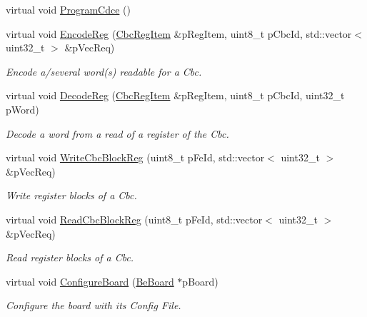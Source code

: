 \begin{DoxyCompactItemize}
\item 
virtual void \hyperlink{class_ph2___hw_interface_1_1_be_board_f_w_interface_a9575de192b6dd5613857ce255ec6947b}{Program\-Cdce} ()
\item 
virtual void \hyperlink{class_ph2___hw_interface_1_1_be_board_f_w_interface_a094deaa5b40e98e2ea8f21c8e74c9431}{Encode\-Reg} (\hyperlink{struct_ph2___hw_description_1_1_cbc_reg_item}{Cbc\-Reg\-Item} \&p\-Reg\-Item, uint8\-\_\-t p\-Cbc\-Id, std\-::vector$<$ uint32\-\_\-t $>$ \&p\-Vec\-Req)
\begin{DoxyCompactList}\small\item\em Encode a/several word(s) readable for a Cbc. \end{DoxyCompactList}\item 
virtual void \hyperlink{class_ph2___hw_interface_1_1_be_board_f_w_interface_ad0bd156b59bcc266949b08ed87a35a00}{Decode\-Reg} (\hyperlink{struct_ph2___hw_description_1_1_cbc_reg_item}{Cbc\-Reg\-Item} \&p\-Reg\-Item, uint8\-\_\-t p\-Cbc\-Id, uint32\-\_\-t p\-Word)
\begin{DoxyCompactList}\small\item\em Decode a word from a read of a register of the Cbc. \end{DoxyCompactList}\item 
virtual void \hyperlink{class_ph2___hw_interface_1_1_be_board_f_w_interface_aea9e44d8b6de6bd204b74eeafba00f7c}{Write\-Cbc\-Block\-Reg} (uint8\-\_\-t p\-Fe\-Id, std\-::vector$<$ uint32\-\_\-t $>$ \&p\-Vec\-Req)
\begin{DoxyCompactList}\small\item\em Write register blocks of a Cbc. \end{DoxyCompactList}\item 
virtual void \hyperlink{class_ph2___hw_interface_1_1_be_board_f_w_interface_a624e0ef864d5bdef907041270d04bffb}{Read\-Cbc\-Block\-Reg} (uint8\-\_\-t p\-Fe\-Id, std\-::vector$<$ uint32\-\_\-t $>$ \&p\-Vec\-Req)
\begin{DoxyCompactList}\small\item\em Read register blocks of a Cbc. \end{DoxyCompactList}\item 
virtual void \hyperlink{class_ph2___hw_interface_1_1_be_board_f_w_interface_a2507c664f19d1d5e3f6de69da16365e8}{Configure\-Board} (\hyperlink{class_ph2___hw_description_1_1_be_board}{Be\-Board} $\ast$p\-Board)
\begin{DoxyCompactList}\small\item\em Configure the board with its Config File. \end{DoxyCompactList}\item 

\end{DoxyCompactItemize}

